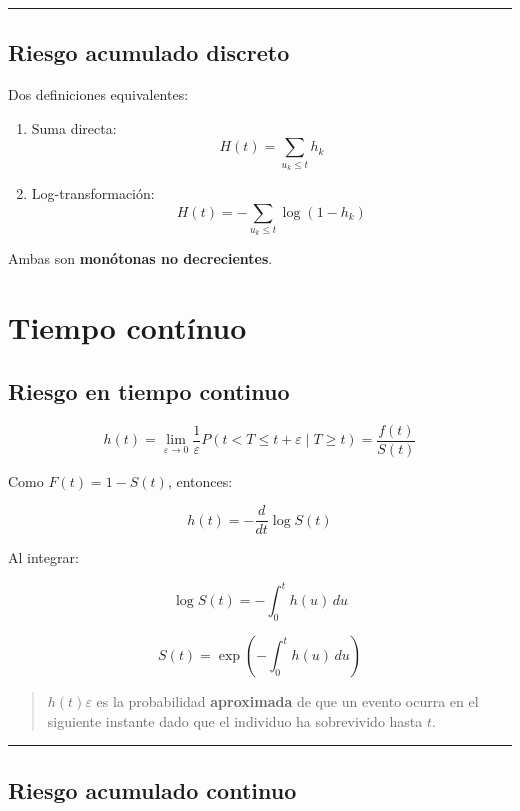 \documentclass[
  letterpaper,
  ignorenonframetext,
  DIV=11,
  numbers=noendperiod]{scrartcl}
\begin{document}
\begin{center}\rule{0.5\linewidth}{0.5pt}\end{center}

\subsection{Riesgo acumulado discreto}\label{riesgo-acumulado-discreto}

Dos definiciones equivalentes:

\begin{enumerate}
\def\labelenumi{\arabic{enumi}.}
\item
  Suma directa: \[
  H(t) = \sum_{u_k \le t} h_k
  \]
\item
  Log-transformación: \[
  H(t) = - \sum_{u_k \le t} \log(1 - h_k)
  \]
\end{enumerate}

Ambas son \textbf{monótonas no decrecientes}.

\section{Tiempo contínuo}\label{tiempo-contuxednuo}

\subsection{Riesgo en tiempo continuo}\label{riesgo-en-tiempo-continuo}

\[
h(t) = \lim_{\varepsilon \to 0} \frac{1}{\varepsilon} P(t < T \le t + \varepsilon \mid T \ge t)
= \frac{f(t)}{S(t)}
\]

Como \(F(t) = 1 - S(t)\), entonces:

\[
h(t) = -\frac{d}{dt} \log S(t)
\]

Al integrar:

\[
\log S(t) = -\int_0^t h(u) \, du
\]

\[
S(t) = \exp\left(-\int_0^t h(u) \, du\right)
\]

\begin{quote}
\(h(t)\varepsilon\) es la probabilidad \textbf{aproximada} de que un
evento ocurra en el siguiente instante dado que el individuo ha
sobrevivido hasta \(t\).
\end{quote}

\begin{center}\rule{0.5\linewidth}{0.5pt}\end{center}

\subsection{Riesgo acumulado continuo}\label{riesgo-acumulado-continuo}
\end{document}
